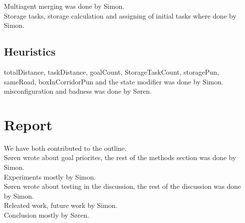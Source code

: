 \documentclass{article}
\begin{document}
Multiagent merging was done by Simon.\\

Storage tasks, storage calculation  and assigning of initial tasks where done by Simon.\\

\subsection{Heuristics}
totalDistance, taskDistance, goalCount, StorageTaskCount, storagePun, sameRoad, boxInCorridorPun
and the state modifier was done by Simon.\\

misconfiguration and badness was done by Søren.

\section{Report}
We have both contributed to the outline.\\
Søren wrote about goal priorites, the rest of the methods section was done by Simon.\\

Experiments mostly by Simon.\\

Søren wrote about testing in the discussion, the rest of the discussion was done by Simon.\\

Releated work, future work by Simon.\\

Conclusion mostly by Søren.
\end{document}
